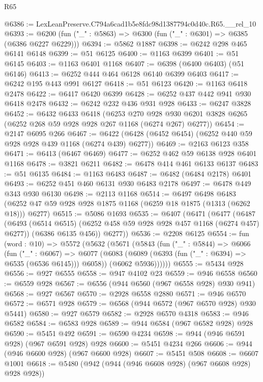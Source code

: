 \begin{lexlean}{R65}
\begin{coremodule}
@6386 := LexLeanPreserve.C794a6cad1b5e8fdc98d1387794c0d40c.R65.__rel_10
@6393 := @6200 (fun ("_" : @5863) => @6300 (fun ("_" : @6301) => @6385 (@6386 @6227 @6229)))
@6394 := @5862 @1887
@6398 := @6242 @298 @465 @6141 @6148
@6399 := @51 @6125
@6400 := @1163 @6399
@6401 := @51 @6145
@6403 := @1163 @6401 @1168
@6407 := @6398 (@6400 @6403) (@51 @6146)
@6413 := @6252 @444 @464 @6128 @6140 @6399 @6403
@6417 := @6242 @195 @443 @991 @6127
@6418 := @51 @6123
@6420 := @1163 @6418 @2478
@6422 := @6417 @6420 @6399
@6428 := @6252 @437 @442 @941 @930 @6418 @2478
@6432 := @6242 @232 @436 @931 @928
@6433 := @6247 @3828
@6452 := @6432
    @6433
    @6418
    (@6253
      @270
      @928
      @930
      @6201
      @3828
      @6265
      (@6252 @268 @59 @928 @928 @267 @1168 (@6274 @267) @6277))
@6454 := @2147 @6095 @266
@6467 := @6422 (@6428 (@6452 @6454) (@6252 @440 @59 @928 @928 @439 @1168 (@6274 @439) @6277))
@6469 := @2163 @6123 @358
@6471 := @6413 (@6467 @6469)
@6477 := @6252 @462 @59 @6138 @928 @6401 @1168
@6478 := @3821 @6211
@6482 := @6478 @414 @461 @6133 @6137
@6483 := @51 @6135
@6484 := @1163 @6483
@6487 := @6482 (@6484 @2178) @6401
@6493 := @6252 @451 @460 @6131 @930 @6483 @2178
@6497 := @6478 @449 @343 @930 @6130
@6498 := @2113 @1168
@6514 := @6497
    @6498
    @6483
    (@6252 @47 @59 @928 @928 @1875 @1168 (@6259 @18 @1875 (@1313 (@6262 @18))) @6277)
@6515 := @5086 @1693
@6535 := @6407
    (@6471
      (@6477
        (@6487
          (@6493 (@6514 @6515) (@6252 @458 @59 @928 @928 @457 @1168 (@6274 @457) @6277))
          (@6386 @6135 @456))
        @6277))
@6536 := @2208 @6125
@6554 := fun (word : @10) =>
  @5572
    (@5632
      (@5671
        (@5843
          (fun ("_" : @5844) =>
          @6066
            (fun ("_" : @6067) =>
            @6077
              (@6083 (@6089 (@6393 (fun ("_" : @6394) => @6535 (@6536 @6145))) @6058))
              (@6062 @5936))))))
@6555 := @5434 @928
@6556 := @927 @6555
@6558 := @947 @4102 @23
@6559 := @946 @6558
@6560 := @6559 @928
@6567 := @6556 (@944 @6560 (@967 @6558 @928) @930 @941)
@6568 := @927 @6567
@6570 := @2928 @6558 @2880
@6571 := @946 @6570
@6572 := @6571 @928
@6579 := @6568 (@944 @6572 (@967 @6570 @928) @930 @5441)
@6580 := @927 @6579
@6582 := @2928 @6570 @4318
@6583 := @946 @6582
@6584 := @6583 @928
@6589 := @944 @6584 (@967 @6582 @928) @928
@6590 := @5451 @492
@6591 := @6590 @4234
@6598 := @944 (@946 @6591 @928) (@967 @6591 @928) @928
@6600 := @5451 @4234 @266
@6606 := @944 (@946 @6600 @928) (@967 @6600 @928)
@6607 := @5451 @508
@6608 := @6607 @1001
@6618 := @5480 (@942 (@944 (@946 @6608 @928) (@967 @6608 @928) @928 @928))

\end{coremodule}
\end{lexlean}
